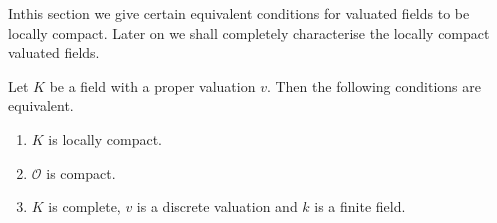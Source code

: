 In\pageoriginale this section we give certain equivalent conditions for valuated
fields to be locally compact. Later on we shall completely
characterise the locally compact valuated fields. 

\begin{theorem}\label{part1:chap1:sec7:thm3}
  Let $K$ be a field with a proper valuation $v$. Then the following
  conditions are equivalent. 
  \begin{enumerate}[\rm(a)]
  \item $K$ is locally compact.
  \item $\mathscr{O}$ is compact.
  \item $K$ is complete, $v$ is a discrete valuation and $k$ is a finite field.
  \end{enumerate}
\end{theorem}

